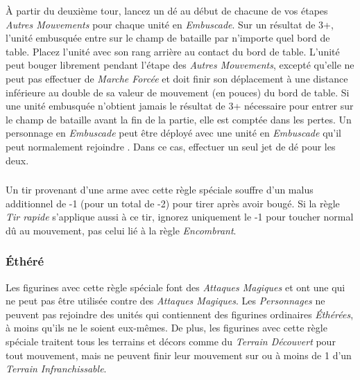  À partir du deuxième tour, lancez un dé au début de chacune de vos étapes \emph{Autres Mouvements} pour chaque unité en \emph{Embuscade}. Sur un résultat de 3+, l'unité embusquée entre sur le champ de bataille par n'importe quel bord de table. Placez l'unité avec son rang arrière au contact du bord de table. L'unité peut bouger librement pendant l'étape des \emph{Autres Mouvements}, excepté qu'elle ne peut pas effectuer de \emph{Marche Forcée} et doit finir son déplacement à une distance inférieure au double de sa valeur de mouvement (en pouces) du bord de table. Si une unité embusquée n'obtient jamais le résultat de 3+ nécessaire pour entrer sur le champ de bataille avant la fin de la partie, elle est comptée dans les pertes. Un personnage en \emph{Embuscade} peut être déployé avec une unité en  \emph{Embuscade} qu'il peut normalement rejoindre . Dans ce cas, effectuer un seul jet de dé pour les deux.    

\subsubsection*{}

Un tir provenant d'une arme avec cette règle spéciale souffre d'un malus additionnel de -1 (pour un total de -2) pour tirer après avoir bougé. Si la règle \emph{Tir rapide} s'applique aussi à ce tir, ignorez uniquement le -1 pour toucher normal dû au mouvement, pas celui lié à la règle \emph{Encombrant}.

\subsubsection*{Éthéré}

Les figurines avec cette règle spéciale font des \emph{Attaques Magiques} et ont une  qui ne peut pas être utilisée contre des \emph{Attaques Magiques}. Les \emph{Personnages} ne peuvent pas rejoindre des unités qui contiennent des figurines ordinaires \emph{Éthérées}, à moins qu'ils ne le soient eux-mêmes. De plus, les figurines avec cette règle spéciale traitent tous les terrains et décors comme du \emph{Terrain Découvert} pour tout mouvement, mais ne peuvent finir leur mouvement sur ou à moins de \unit{1}{\pouce} d'un \emph{Terrain Infranchissable}.

